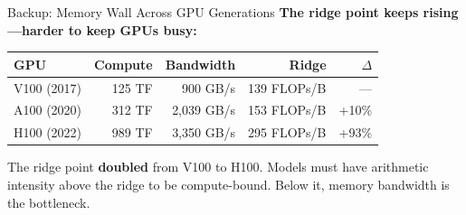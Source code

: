 \documentclass[aspectratio=169, 12pt]{beamer}
\begin{document}
\begin{frame}{Backup: Memory Wall Across GPU Generations}
\note{
%
%
}
\small
\textbf{The ridge point keeps rising---harder to keep GPUs busy:}

\vspace{0.15cm}
\renewcommand{\arraystretch}{1.15}
{\footnotesize
\begin{tabular}{@{}lrrrr@{}}
  \toprule
  \textbf{GPU} & \textbf{Compute} & \textbf{Bandwidth} & \textbf{Ridge} & \textbf{$\Delta$} \\
  \midrule
  V100 (2017) & 125 TF & 900 GB/s & 139 FLOPs/B & --- \\
  A100 (2020) & 312 TF & 2,039 GB/s & 153 FLOPs/B & +10\% \\
  H100 (2022) & 989 TF & 3,350 GB/s & 295 FLOPs/B & +93\% \\
  \bottomrule
\end{tabular}
}

\vspace{0.15cm}
The ridge point \textbf{doubled} from V100 to H100. Models must have arithmetic intensity above the ridge to be compute-bound. Below it, memory bandwidth is the bottleneck.
\end{frame}
\end{document}
